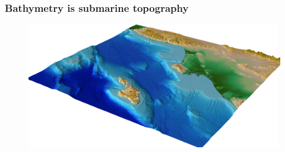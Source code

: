 \documentclass[7pt]{beamer}
\begin{document}
\begin{frame}
\frametitle{Bathymetry is submarine topography}


\begin{figure}[h]
\includegraphics[width=1.\linewidth]{img/bath_topo_example.png}\hfill
\end{figure}


\end{frame}
\end{document}
